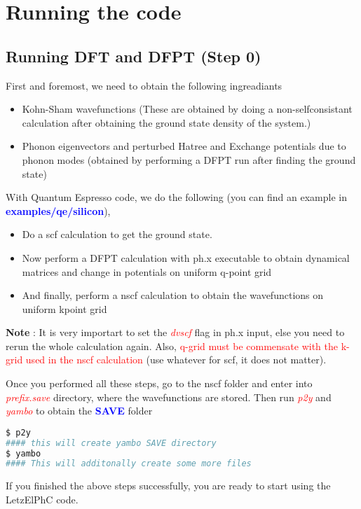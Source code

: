 \documentclass[12pt,twoside,openany]{book}
\begin{document}
\chapter{Running the code}
\section{Running DFT and DFPT (Step 0)}
First and foremost, we need to obtain the following ingreadiants
\begin{itemize}
\item Kohn-Sham wavefunctions (These are obtained by doing a non-selfconsistant calculation after obtaining
the ground state density of the system.)
\item Phonon eigenvectors and perturbed Hatree and Exchange potentials due to phonon modes 
(obtained by performing a DFPT run after finding the ground state)
\end{itemize}

With Quantum Espresso code, we do the following (you can find an example in \textcolor{blue}{\bf{examples/qe/silicon}}),
\begin{itemize}
    \item Do a scf calculation to get the ground state.
    \item Now perform a DFPT calculation with ph.x executable to obtain dynamical matrices and change in potentials on 
    uniform q-point grid
    \item And finally, perform a nscf calculation to obtain the wavefunctions on uniform kpoint grid
\end{itemize}

{\bf{Note}} : It is very importart to set the \textcolor{red}{\emph{dvscf}} flag in ph.x input, else you need to rerun the whole calculation again.
Also, \textcolor{red}{q-grid must be commensate with the k-grid used in the nscf calculation} (use whatever for scf, it does not matter).

Once you performed all these steps, go to the nscf folder and enter into \textcolor{red}{\emph{prefix.save}} directory, where the wavefunctions 
are stored. Then run \textcolor{red}{\emph{p2y}} and \textcolor{red}{\emph{yambo}} to obtain the \textcolor{blue}{\bf{SAVE}} folder
\begin{lstlisting}[language=bash]
$ p2y
#### this will create yambo SAVE directory
$ yambo
#### This will additonally create some more files
\end{lstlisting}
If you finished the above steps successfully, you are ready to start using the LetzElPhC code.
\end{document}
